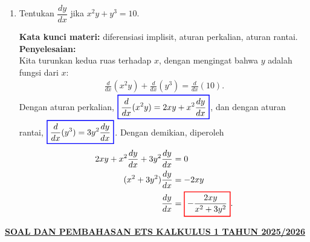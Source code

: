 \documentclass[10pt,openany,a4paper]{article}
\theoremstyle{definition}
\theoremstyle{definition}
\theoremstyle{plain}
\newenvironment{jawab}[2][tes]{%
\par\noindent\textbf{Kata kunci materi:} #1.\\
\textbf{Penyelesaian:} #2%
}{}
\begin{document}
\begin{enumerate}
\begin{jawab}[fungsi kontinu, limit sepihak, turunan sepihak]
{                \[\colorlet{oldcolor}{.}
        \color{red}
        \setlength{\fboxrule}{1pt} \boxed{\color{oldcolor}f \text{ kontinu tetapi tidak dapat diturunkan di } x=2}\color{oldcolor}.\]
                Secara grafik, di titik $(2,7)$ grafik $f$ membentuk ``sudut'' (tidak mulus).
            }
            \end{jawab}
            \item Tentukan $\dfrac{dy}{dx}$ jika $x^2y+y^3=10$.
            \begin{jawab}[diferensiasi implisit, aturan perkalian, aturan rantai]{~\\
                Kita turunkan kedua ruas terhadap $x$, dengan mengingat bahwa $y$ adalah fungsi dari $x$:
                \begin{align*}
                    \frac{d}{dx}(x^2y) + \frac{d}{dx}(y^3) = \frac{d}{dx}(10).
                \end{align*}
                Dengan aturan perkalian, $\colorlet{oldcolor}{.}
        \color{blue}
        \setlength{\fboxrule}{1pt} \boxed{\color{oldcolor}\frac{d}{dx}(x^2y) = 2xy + x^2\frac{dy}{dx}}\color{oldcolor}$, dan dengan aturan rantai, $\colorlet{oldcolor}{.}
        \color{blue}
        \setlength{\fboxrule}{1pt} \boxed{\color{oldcolor}\frac{d}{dx}(y^3) = 3y^2\frac{dy}{dx}}\color{oldcolor}$. Dengan demikian, diperoleh
                \begin{align*}
                    2xy + x^2\frac{dy}{dx} + 3y^2\frac{dy}{dx} &= 0\\
                    (x^2 + 3y^2)\frac{dy}{dx} &= -2xy\\
                    \frac{dy}{dx} &= \colorlet{oldcolor}{.}
        \color{red}
        \setlength{\fboxrule}{1pt} \boxed{\color{oldcolor}-\frac{2xy}{x^2 + 3y^2}}\color{oldcolor}.
                \end{align*}
            }
            \end{jawab}
        \end{enumerate}
               \newpage
 \begin{center}
	{\underline{\textbf{\MakeUppercase{Soal dan Pembahasan ETS Kalkulus 1 Tahun 2025/2026}}}}
    \end{center}
\end{document}
